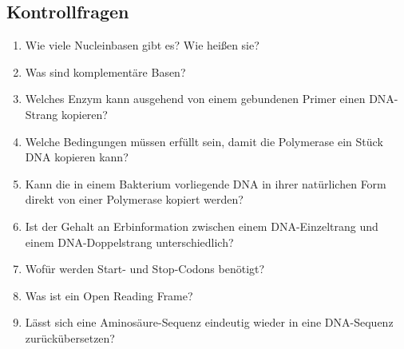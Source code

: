 \subsection{Kontrollfragen}
\begin{enumerate}
	\item Wie viele Nucleinbasen gibt es? Wie heißen sie?
	\item Was sind komplementäre Basen?
	\item Welches Enzym kann ausgehend von einem gebundenen Primer einen DNA-Strang kopieren?
	\item Welche Bedingungen müssen erfüllt sein, damit die Polymerase ein Stück DNA kopieren kann?
	\item Kann die in einem Bakterium vorliegende DNA in ihrer natürlichen Form direkt von einer Polymerase kopiert werden?
	\item Ist der Gehalt an Erbinformation zwischen einem DNA-Einzeltrang und einem DNA-Doppelstrang unterschiedlich?
	\item Wofür werden Start- und Stop-Codons benötigt?
	\item Was ist ein Open Reading Frame?
	\item Lässt sich eine Aminosäure-Sequenz eindeutig wieder in eine DNA-Sequenz zurückübersetzen?
\end{enumerate}

